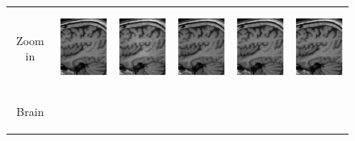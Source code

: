 \documentclass[review]{elsarticle}
\begin{document}
\begin{figure}[H]
\begin{raggedleft}
\begin{tabular}{cccccc}
			\tabularnewline
			
			\multirow{1}{0.05cm}[1.3cm]{\begin{turn}{90} {\footnotesize Zoom in} \end{turn}} &
			
			\includegraphics[width=2.5cm,height=2.5cm]{include/grp2/factor2/019-Guys-0702-T1/019-Guys-0702-T1_images__zoom_78} &
			\includegraphics[width=2.5cm,height=2.5cm]{include/grp2/factor2/019-Guys-0702-T1/019-Guys-0702-T1_images__zeroPadding_zoom_78} & 
			\includegraphics[width=2.5cm,height=2.5cm]{include/grp2/factor2/019-Guys-0702-T1/019-Guys-0702-T1_images__CS_zoom_78} & \includegraphics[width=2.5cm,height=2.5cm]{include/grp2/factor2/019-Guys-0702-T1/019-Guys-0702-T1_images__IMCNNL2TUNE_zoom_78} & \includegraphics[width=2.5cm,height=2.5cm]{include/grp2/factor2/019-Guys-0702-T1/019-Guys-0702-T1_images__predict_zoom_78}
			
			\tabularnewline
			
			\multirow{2}{0.05cm}[1.4cm]{\begin{turn}{90} {\footnotesize Brain} \end{turn}} & 
			

\end{tabular}
\end{raggedleft}
\end{figure}
\end{document}
